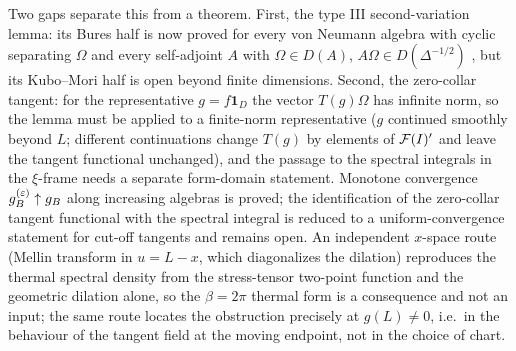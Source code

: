 Two gaps separate this from a theorem.  First, the type III second-variation
lemma: its Bures half is now proved for every von Neumann algebra with cyclic
separating $\Omega$ and every self-adjoint $A$ with $\Omega\in D(A)$,
$A\Omega\in D(\Delta^{-1/2})$ \cite{RigorSV}, but its Kubo--Mori half is open
beyond finite dimensions.  Second, the zero-collar tangent: for the representative
$g=f\mathbf1_D$ the vector $T(g)\Omega$ has infinite norm, so the lemma must be
applied to a finite-norm representative ($g$ continued smoothly beyond $L$;
different continuations change $T(g)$ by elements of $\mathcal F(I)'$ and leave the
tangent functional unchanged), and the passage to the spectral integrals in the
$\xi$-frame needs a separate form-domain statement.  Monotone convergence
$g_B^{(\varepsilon)}\uparrow g_B$ along increasing algebras is proved; the identification
of the zero-collar tangent functional with the spectral integral is reduced to a
uniform-convergence statement for cut-off tangents and remains open.  An
independent $x$-space route (Mellin transform in $u=L-x$, which diagonalizes the
dilation) reproduces the thermal spectral density from the stress-tensor two-point
function and the geometric dilation alone, so the $\beta=2\pi$ thermal form is a
consequence and not an input; the same route locates the obstruction precisely at
$g(L)\ne0$, i.e.\ in the behaviour of the tangent field at the moving endpoint, not
in the choice of chart.

